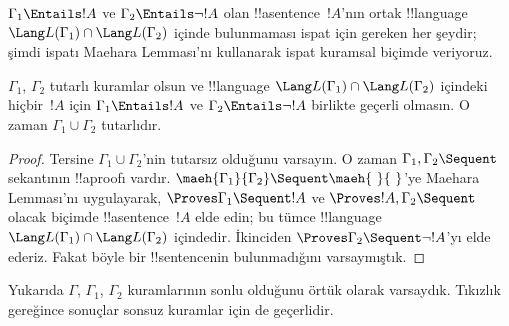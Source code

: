 $\Gamma_1 \Entails !A$ ve $\Gamma_2 \Entails \lnot !A$ olan
!!a{sentence}~$!A$'nın ortak !!{language}~$\Lang L(\Gamma_1) \cap \Lang
L(\Gamma_2)$ içinde bulunmaması ispat için gereken her şeydir; şimdi ispatı
Maehara Lemması'nı kullanarak ispat kuramsal biçimde veriyoruz.

\begin{thm}
$\Gamma_1$, $\Gamma_2$ tutarlı kuramlar olsun ve !!{language} $\Lang
L(\Gamma_1) \cap \Lang L(\Gamma_2)$ içindeki hiçbir~$!A$ için $\Gamma_1
\Entails !A$ ve $\Gamma_2 \Entails \lnot !A$ birlikte geçerli olmasın. O
zaman $\Gamma_1 \cup \Gamma_2$ tutarlıdır.
\end{thm}

\begin{proof}
  Tersine $\Gamma_1 \cup \Gamma_2$'nin tutarsız olduğunu varsayın. O zaman
  $\Gamma_1, \Gamma_2 \Sequent \ $ sekantının !!a{proof}{}ı vardır.
  $\maeh{\Gamma_1}{\Gamma_2} \Sequent \maeh{\ }{\ }$'ye Maehara Lemması'nı
  uygulayarak, $\Proves \Gamma_1 \Sequent !A$ ve $\Proves !A, \Gamma_2
  \Sequent \quad$ olacak biçimde !!a{sentence}~$!A$ elde edin; bu tümce
  !!{language}~$\Lang L(\Gamma_1) \cap \Lang L(\Gamma_2)$ içindedir.
  İkinciden $\Proves
  \Gamma_2 \Sequent \lnot !A$'yı elde ederiz. Fakat böyle bir
  !!{sentence}{}nin bulunmadığını varsaymıştık.
\end{proof}

Yukarıda $\Gamma$, $\Gamma_1$, $\Gamma_2$ kuramlarının sonlu olduğunu
örtük olarak varsaydık. Tıkızlık gereğince sonuçlar sonsuz kuramlar için de
geçerlidir.

